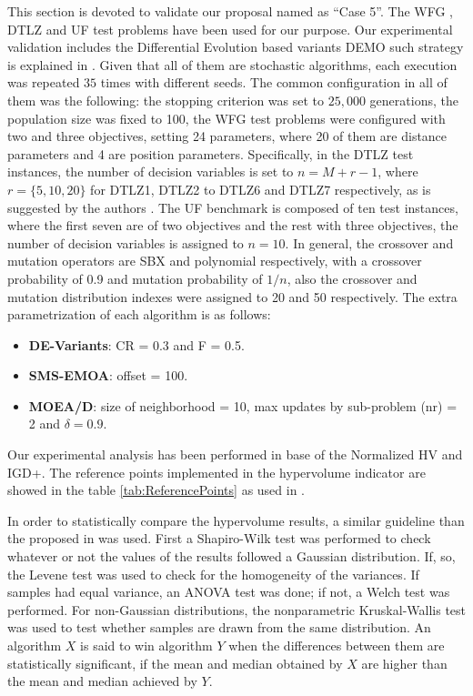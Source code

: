 This section is devoted to validate our proposal named as ``Case 5''.
%
The WFG \cite{Joel:WFG}, DTLZ \cite{Joel:DTLZ_2} and UF \cite{zhang2009performance} test problems have been used for our purpose.
%
Our experimental validation includes the Differential Evolution based variants DEMO such strategy is explained in \cite{tuvsar2007differential}.
%
Given that all of them are stochastic algorithms, each execution was repeated $35$ times with different seeds.
%
The common configuration in all of them was the following: the stopping criterion was set to $25,000$ generations, the population size was fixed to 100, the WFG test problems were configured with two and three objectives, setting 24 parameters, where 20 of them are distance parameters and 4 are position parameters.
%
Specifically, in the DTLZ test instances, the number of decision variables is set to $n=M+r-1$, where $r=\{5, 10, 20\}$ for DTLZ1, DTLZ2 to DTLZ6 and DTLZ7 respectively, as is suggested by the authors \cite{Joel:DTLZ_2}.  
% 
The UF benchmark is composed of ten test instances, where the first seven are of two objectives and the rest with three objectives, the number of decision variables is assigned to $n=10$.
%
In general, the crossover and mutation operators are SBX and polynomial respectively, with a crossover probability of 0.9 and mutation probability of $1/n$, also the crossover and mutation distribution indexes were assigned to 20 and 50 respectively.
%
The extra parametrization of each algorithm is as follows:
\begin{itemize}
\item \textbf{DE-Variants}: CR = 0.3 and F = 0.5.
\item \textbf{SMS-EMOA}: offset = 100.
\item \textbf{MOEA/D}: size of neighborhood = 10, max updates by sub-problem (nr) = 2 and $\delta = 0.9$.
\end{itemize}
%
Our experimental analysis has been performed in base of the Normalized HV and IGD+.
%
The reference points implemented in the hypervolume indicator are showed in the table \ref{tab:ReferencePoints} as used in \cite{Joel:Kuhn_Munkres, Joel:OperatorAHX}.


In order to statistically compare the hypervolume results, a similar guideline than the proposed in \cite{Joel:StatisticalTest} was used. 
%
First a Shapiro-Wilk test was performed to check whatever or not the values of the results followed a Gaussian distribution. 
%
If, so, the Levene test was used to check for the homogeneity of the variances. 
%
If samples had equal variance, an ANOVA test was done; if not, a Welch test was performed. 
%
For non-Gaussian distributions, the nonparametric Kruskal-Wallis test was used to test whether samples are drawn from the same distribution. 
%
An algorithm $X$ is said to win algorithm $Y$ when the differences between them are statistically significant, if the mean and median obtained by $X$ are higher than the mean and median achieved by $Y$.
%

